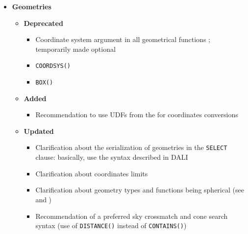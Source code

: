 \documentclass[11pt,a4paper]{ivoa}
\begin{document}
\begin{itemize}
\begin{itemize}
\begin{itemize}
                \end{itemize}
        \end{itemize}
    \item \textbf{Geometries}
        \begin{itemize}
            \item \textbf{Deprecated}
                \begin{itemize}
                    \item Coordinate system argument in all geometrical
                          functions ; temporarily made optional
                    \item \verb:COORDSYS(): 
                    \item \verb:BOX(): 
                \end{itemize}
            \item \textbf{Added}
                \begin{itemize}
                    \item Recommendation to use UDFs from the \CatalogueUDF{}
                          for coordinates conversions
                \end{itemize}
            \item \textbf{Updated}
                \begin{itemize}
                    \item Clarification about the serialization of geometries in
                          the \verb:SELECT: clause: basically, use the syntax
                          described in DALI 
                    \item Clarification about coordinates limits
                    \item Clarification about geometry types and functions being
                          spherical
                          (see  and
                          )
                    \item Recommendation of a preferred sky crossmatch and
                          cone search syntax (use
                          of \verb:DISTANCE(): instead of \verb:CONTAINS():)

\end{itemize}
\end{itemize}
\end{itemize}
\end{document}
